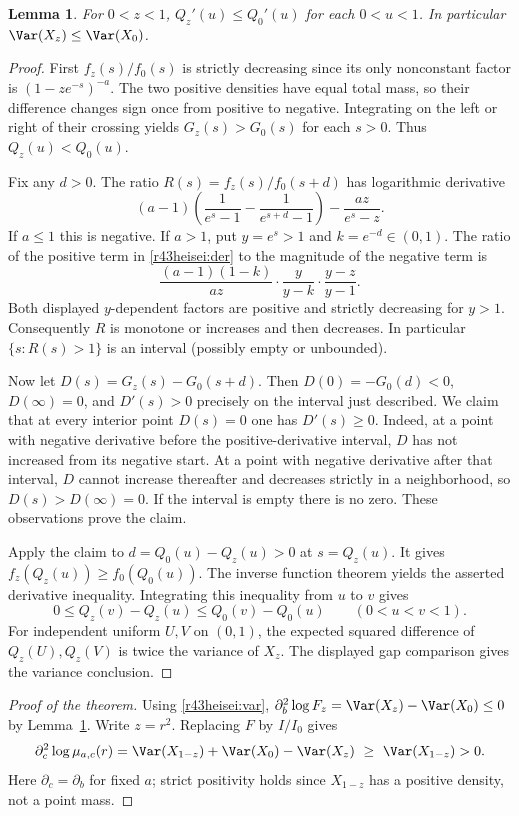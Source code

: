 \documentclass[11pt,a4paper]{article}
\numberwithin{equation}{section}
\newtheorem{lemma}[theorem]{Lemma}
\theoremstyle{definition}
\theoremstyle{remark}
\begin{document}
\begin{lemma}\label{r43heisei:disp}
For $0<z<1$, $Q_z'(u)\le Q_0'(u)$ for each $0<u<1$. In particular $\Var(X_z)\le\Var(X_0)$.
\end{lemma}
\begin{proof}
First $f_z(s)/f_0(s)$ is strictly decreasing since its only nonconstant factor is $(1-ze^{-s})^{-a}$. The two positive densities have equal total mass, so their difference changes sign once from positive to negative. Integrating on the left or right of their crossing yields $G_z(s)>G_0(s)$ for each $s>0$. Thus $Q_z(u)<Q_0(u)$.

Fix any $d>0$. The ratio $R(s)=f_z(s)/f_0(s+d)$ has logarithmic derivative
\begin{equation}\label{r43heisei:der}
 (a-1)\left(\frac{1}{e^s-1}-\frac{1}{e^{s+d}-1}\right)
       -\frac{az}{e^s-z}.
\end{equation}
If $a\le1$ this is negative. If $a>1$, put $y=e^s>1$ and $k=e^{-d}\in(0,1)$. The ratio of the positive term in \eqref{r43heisei:der} to the magnitude of the negative term is
\[
 \frac{(a-1)(1-k)}{az}\cdot\frac{y}{y-k}\cdot\frac{y-z}{y-1}.
\]
Both displayed $y$-dependent factors are positive and strictly decreasing for $y>1$. Consequently $R$ is monotone or increases and then decreases. In particular $\{s:R(s)>1\}$ is an interval (possibly empty or unbounded).

Now let $D(s)=G_z(s)-G_0(s+d)$. Then $D(0)=-G_0(d)<0$, $D(\infty)=0$, and $D'(s)>0$ precisely on the interval just described. We claim that at every interior point $D(s)=0$ one has $D'(s)\ge0$. Indeed, at a point with negative derivative before the positive-derivative interval, $D$ has not increased from its negative start. At a point with negative derivative after that interval, $D$ cannot increase thereafter and decreases strictly in a neighborhood, so $D(s)>D(\infty)=0$. If the interval is empty there is no zero. These observations prove the claim.

Apply the claim to $d=Q_0(u)-Q_z(u)>0$ at $s=Q_z(u)$. It gives $f_z(Q_z(u))\ge f_0(Q_0(u))$. The inverse function theorem yields the asserted derivative inequality. Integrating this inequality from $u$ to $v$ gives
\[
 0\le Q_z(v)-Q_z(u)\le Q_0(v)-Q_0(u)\qquad(0<u<v<1).
\]
For independent uniform $U,V$ on $(0,1)$, the expected squared difference of $Q_z(U),Q_z(V)$ is twice the variance of $X_z$. The displayed gap comparison gives the variance conclusion.
\end{proof}

\begin{proof}[Proof of the theorem]
Using \eqref{r43heisei:var}, $\partial_b^2\log F_z=\Var(X_z)-\Var(X_0)\le0$ by Lemma~\ref{r43heisei:disp}. Write $z=r^2$. Replacing $F$ by $I/I_0$ gives
\[
 \partial_c^2\log\mu_{a,c}(r)=\Var(X_{1-z})+\Var(X_0)-\Var(X_z)
     \ \ge\ \Var(X_{1-z})>0 .
\]
Here $\partial_c=\partial_b$ for fixed $a$; strict positivity holds since $X_{1-z}$ has a positive density, not a point mass.
\end{proof}
\end{document}
